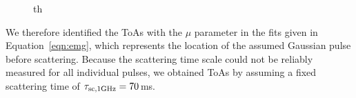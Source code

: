 \documentclass[fleqn,usenatbib]{mnras}
\newcommand{\Eqn}{Equation}
\begin{document}
\begin{figure}{th}
                  \label{fig:stacked_spectra}
\end{figure}

We therefore identified the ToAs with the $\mu$ parameter in the fits given in \Eqn~\ref{eqn:emg}, which represents the location of the assumed Gaussian pulse before scattering.
Because the scattering time scale could not be reliably measured for all individual pulses, we obtained ToAs by assuming a fixed scattering time of $\tau_{\rm sc,1 GHz} = 70$\,ms.

\end{document}
